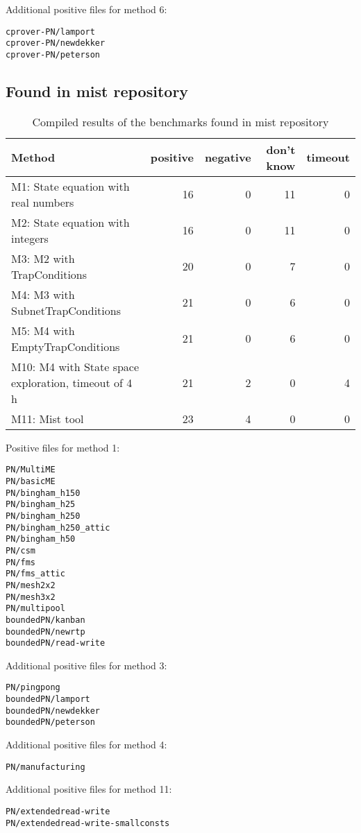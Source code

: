 \documentclass{article}
\begin{document}
Additional positive files for method 6:
\begin{lstlisting}
cprover-PN/lamport
cprover-PN/newdekker
cprover-PN/peterson
\end{lstlisting}

\newpage

\subsection{Found in mist repository}

\begin{table}[h]
\begin{center}
  \begin{tabular}{ | p{6cm} | r | r | r | r | }
    \hline
    Method & positive & negative & don't know & timeout \\
    \hline
    M1: State equation with real numbers & 16 &  0 & 11 &  0 \\
    M2: State equation with integers     & 16 &  0 & 11 &  0 \\
    \hline
    M3: M2 with TrapConditions               & 20 &  0 &  7 &  0 \\
    M4: M3 with SubnetTrapConditions         & 21 &  0 &  6 &  0 \\
    M5: M4 with EmptyTrapConditions          & 21 &  0 &  6 &  0 \\
    \hline
    M10: M4 with State space exploration, timeout of 4\,h & 21 &  2 & 0 &  4 \\
    \hline
    M11: Mist tool & 23 &  4 & 0 &  0 \\
    \hline
  \end{tabular}
\end{center}
\caption{Compiled results of the benchmarks found in mist repository}
\label{table-results-compiled-mist}
\end{table}

Positive files for method 1:
\begin{lstlisting}
PN/MultiME
PN/basicME
PN/bingham_h150
PN/bingham_h25
PN/bingham_h250
PN/bingham_h250_attic
PN/bingham_h50
PN/csm
PN/fms
PN/fms_attic
PN/mesh2x2
PN/mesh3x2
PN/multipool
boundedPN/kanban
boundedPN/newrtp
boundedPN/read-write
\end{lstlisting}

Additional positive files for method 3:
\begin{lstlisting}
PN/pingpong
boundedPN/lamport
boundedPN/newdekker
boundedPN/peterson
\end{lstlisting}

Additional positive files for method 4:
\begin{lstlisting}
PN/manufacturing
\end{lstlisting}

Additional positive files for method 11:
\begin{lstlisting}
PN/extendedread-write
PN/extendedread-write-smallconsts
\end{lstlisting}
\end{document}
